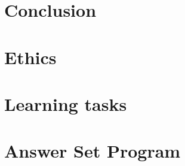 \documentclass[11pt,twoside]{report}
\theoremstyle{plain}
\theoremstyle{definition}
\begin{document}
\chapter{Conclusion}
\label{conclusion}


\newpage



\newpage
\appendix
\chapter{Ethics}



\newpage
\chapter{Learning tasks}


\newpage
\chapter{Answer Set Program}

\end{document}
